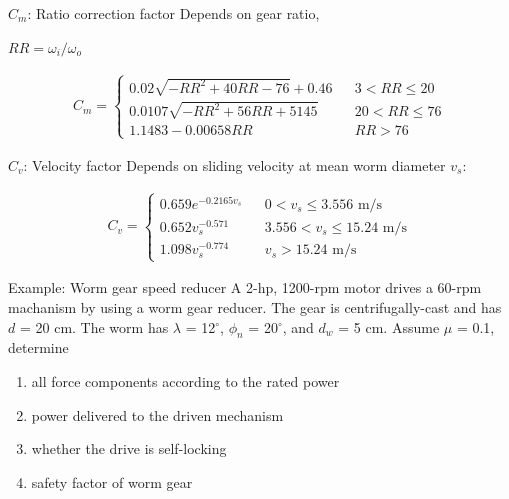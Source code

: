 \documentclass[10pt, svgnames]{beamer}
\begin{document}
\begin{frame}[label={sec:org84efbb3}]{\(C_{m}\): Ratio correction factor}
Depends on gear ratio,

\(RR = \omega_{i}/\omega_{o}\)

\begin{align*}
    C_{m} = \left\{
    \begin{array}{lll}
      0.02 \sqrt{-RR^{2} + 40 RR - 76} + 0.46 &  & 3 < RR \leqslant 20 \\
      0.0107 \sqrt{-RR^{2} + 56RR + 5145} &  & 20 < RR \leqslant 76 \\
      1.1483 - 0.00658RR &  & RR > 76
    \end{array} \right.
\end{align*}
\end{frame}

\begin{frame}[label={sec:org3774d70}]{\(C_{v}\): Velocity factor}
Depends on sliding velocity at mean worm diameter \(v_{s}\):

\begin{align*}
    C_{v} = \left\{
    \begin{array}{lll}
      0.659 e^{-0.2165 v_{s}} &  & 0 < v_{s} \leqslant 3.556 \text{ m/s}\\
      0.652 v_{s}^{-0.571} &  & 3.556 < v_{s} \leqslant 15.24 \text{ m/s}\\
      1.098 v_{s}^{-0.774} &  & v_{s} > 15.24 \text{ m/s}
    \end{array} \right.
\end{align*}
\end{frame}

\begin{frame}[label={sec:orgc2b4e51}]{Example: Worm gear speed reducer}
A 2-hp, 1200-rpm motor drives a 60-rpm machanism by using a worm gear reducer. The gear is centrifugally-cast and has \(d\) = 20 cm. The worm has \(\lambda\) = 12\(^{\circ}\), \(\phi_{n}\) = 20\(^{\circ}\), and \(d_{w}\) = 5 cm. Assume \(\mu\) = 0.1, determine

\begin{enumerate}
\item all force components according to the rated power

\item power delivered to the driven mechanism

\item whether the drive is self-locking

\item safety factor of worm gear
\end{enumerate}
\end{frame}
\end{document}
